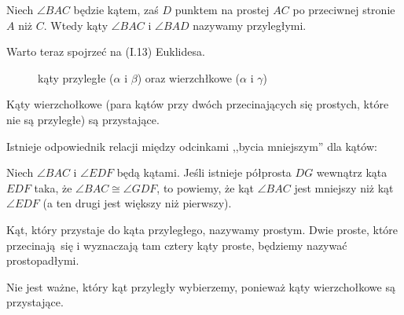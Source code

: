 \begin{definition}
    Niech $\angle BAC$ będzie kątem, zaś $D$ punktem na prostej $AC$ po przeciwnej stronie $A$ niż $C$.
    Wtedy kąty $\angle BAC$ i $\angle BAD$ nazywamy przyległymi. %
\end{definition}

Warto teraz spojrzeć na (I.13) Euklidesa.

\begin{figure}[H] \centering
\begin{comment}
\begin{tikzpicture}[scale=.6]
    \tkzDefPoint(-4, -2){A}
    \tkzDefPoint(4, 2){B}
    \tkzDefPoint(4, -2){C}
    \tkzDefPoint(-4, 2){D}
    \tkzDefPoint(0, 0){Zero}
    \tkzDefPoint(0, 0.7){X1}
    \tkzDefPoint(-1.7, 0){X2}
    \tkzDefPoint(1.7, 0){X3}
    \tkzMarkAngle[arc=l,size=1.2,mark=||](D,Zero,A)
    \tkzMarkAngle[arc=l,size=1.2,mark=||](C,Zero,B)
    \tkzMarkAngle[arc=ll,size=1.2](B,Zero,D)

    \tkzDrawSegments[line width=0.3mm](A,B)
    \tkzDrawSegments[line width=0.3mm](C,D)
    \tkzLabelPoint[anchor=center](X1){$\beta$}
    \tkzLabelPoint[anchor=center](X2){$\alpha$}
    \tkzLabelPoint[anchor=center](X3){$\gamma$}
\end{tikzpicture}
\end{comment}
    \caption{kąty przyległe ($\alpha$ i $\beta$) oraz wierzchłkowe ($\alpha$ i $\gamma$)}
\end{figure}

\begin{proposition}
    Kąty wierzchołkowe (para kątów przy dwóch przecinających się prostych, które nie są przyległe) są przystające.
\end{proposition}


Istnieje odpowiednik relacji między odcinkami ,,bycia mniejszym'' dla kątów:

\begin{definition}
    Niech $\angle BAC$ i $\angle EDF$ będą kątami.
    Jeśli istnieje półprosta $DG$ wewnątrz kąta $EDF$ taka, że $\angle BAC \cong \angle GDF$, to powiemy, że kąt $\angle BAC$ jest mniejszy niż kąt $\angle EDF$ (a ten drugi jest większy niż pierwszy).
\end{definition}

\begin{definition}
    Kąt, który przystaje do kąta przyległego, nazywamy prostym.
    Dwie proste, które przecinają się i wyznaczają tam cztery kąty proste, będziemy nazywać prostopadłymi.
\end{definition}

Nie jest ważne, który kąt przyległy wybierzemy, ponieważ kąty wierzchołkowe są przystające.

